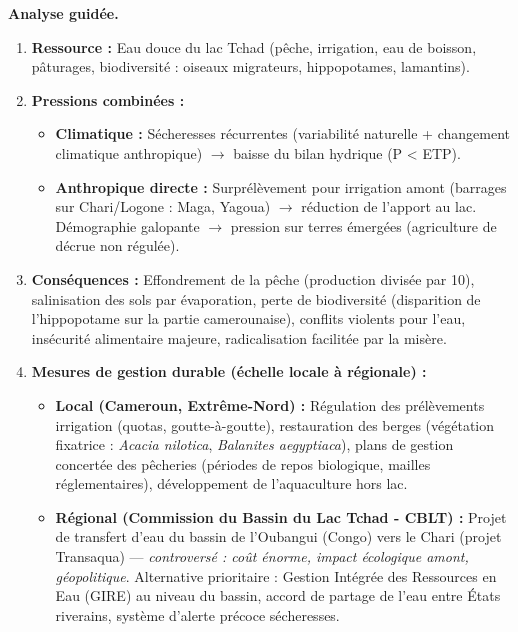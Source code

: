 \documentclass[11pt]{article}
\newcommand{\cle}[1]{{\popxbold\color{popdark}#1}}
\begin{document}
\begin{experience}
\textbf{Analyse guidée.}
\begin{enumerate}
    \item \textbf{Ressource :} Eau douce du lac Tchad (pêche, irrigation, eau de boisson, pâturages, biodiversité : oiseaux migrateurs, hippopotames, lamantins).
    \item \textbf{Pressions combinées :}
    \begin{itemize}
        \item \textbf{Climatique :} Sécheresses récurrentes (variabilité naturelle + \cle{changement climatique anthropique}) $\rightarrow$ baisse du bilan hydrique (P < \cle{ETP}).
        \item \textbf{Anthropique directe :} Surprélèvement pour irrigation amont (barrages sur Chari/Logone : Maga, Yagoua) $\rightarrow$ réduction de l'apport au lac. Démographie galopante $\rightarrow$ pression sur terres émergées (agriculture de décrue non régulée).
    \end{itemize}
    \item \textbf{Conséquences :} Effondrement de la pêche (production divisée par 10), \cle{salinisation} des sols par évaporation, perte de biodiversité (disparition de l'hippopotame sur la partie camerounaise), conflits violents pour l'eau, insécurité alimentaire majeure, radicalisation facilitée par la misère.
    \item \textbf{Mesures de gestion durable (échelle locale à régionale) :}
    \begin{itemize}
        \item \textbf{Local (Cameroun, Extrême-Nord) :} Régulation des prélèvements irrigation (\cle{quotas}, \cle{goutte-à-goutte}), restauration des berges (végétation fixatrice : \emph{Acacia nilotica}, \emph{Balanites aegyptiaca}), plans de gestion concertée des pêcheries (périodes de repos biologique, mailles réglementaires), développement de l'\cle{aquaculture} hors lac.
        \item \textbf{Régional (Commission du Bassin du Lac Tchad - CBLT) :} Projet de transfert d'eau du bassin de l'Oubangui (Congo) vers le Chari (projet \cle{Transaqua}) — \emph{controversé : coût énorme, impact écologique amont, géopolitique}. Alternative prioritaire : \cle{Gestion Intégrée des Ressources en Eau (GIRE)} au niveau du bassin, accord de partage de l'eau entre États riverains, \cle{système d'alerte précoce} sécheresses.
    \end{itemize}
\end{enumerate}
\end{experience}
\end{document}
